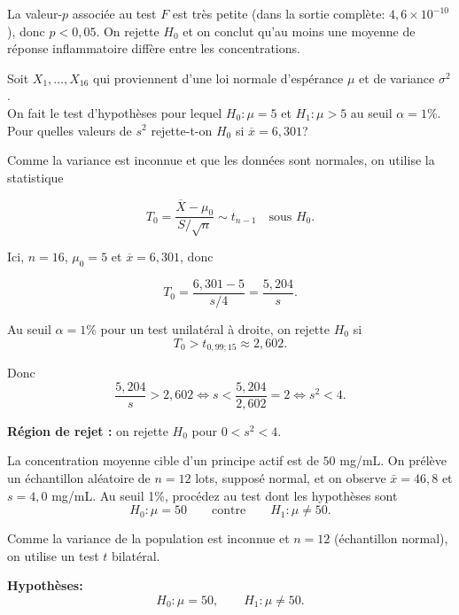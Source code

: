 \begin{questions}
\begin{parts}
\begin{solution}
La valeur-$p$ associée au test $F$ est très petite (dans la sortie complète: $4{,}6\times 10^{-10}$), donc $p<0{,}05$. On rejette $H_0$ et on conclut qu'au moins une moyenne de réponse inflammatoire diffère entre les concentrations.
\end{solution}

\end{parts}


\pageblanche
\question[10] Soit $X_1,\hdots, X_{16}$ qui proviennent d'une loi normale d'espérance $\mu$ et de variance $\sigma^2$. \\
On fait le test d'hypothèses pour lequel
$H_0:\mu=5$ et $H_1:\mu>5$ au seuil $\alpha=1\%$.\\
Pour quelles valeurs de $s^2$ rejette-t-on $H_0$ si $\overline{x}=6,301$?

\begin{solution}
    Comme la variance est inconnue et que les données sont normales, on utilise
    la statistique

    \[
    T_0=\frac{\overline{X}-\mu_0}{S/\sqrt{n}}\sim t_{n-1}\quad\text{sous }H_0.
    \]

    Ici, $n=16$, $\mu_0=5$ et $\overline{x}=6{,}301$, donc

    \[
    T_0=\frac{6{,}301-5}{s/4}=\frac{5{,}204}{s}.
    \]

    Au seuil $\alpha=1\%$ pour un test unilatéral à droite,
    on rejette $H_0$ si
    \[
    T_0>t_{0{,}99;15}\approx 2{,}602.
    \]

    Donc
    \[
    \frac{5{,}204}{s}>2{,}602
    \iff s<\frac{5{,}204}{2{,}602}=2
    \iff s^2<4.
    \]

    \textbf{Région de rejet :} on rejette $H_0$ pour $0<s^2<4$.
\end{solution}


\pageblanche
\question[10] 
La concentration moyenne cible d'un principe actif est de $50$ mg/mL.
On prélève un échantillon aléatoire de $n=12$ lots, supposé normal, et on observe
$\bar{x}=46{,}8$ et $s=4{,}0$ mg/mL.
Au seuil 1\%, procédez au test dont les hypothèses sont
\[
H_0:\mu=50\qquad\text{contre}\qquad H_1:\mu\neq 50.
\]

\begin{solution}
Comme la variance de la population est inconnue et $n=12$ (échantillon normal), on utilise un test $t$ bilatéral.

\textbf{Hypothèses:}
\[
H_0:\mu=50,\qquad H_1:\mu\neq 50.
\]


\end{solution}
\end{questions}
